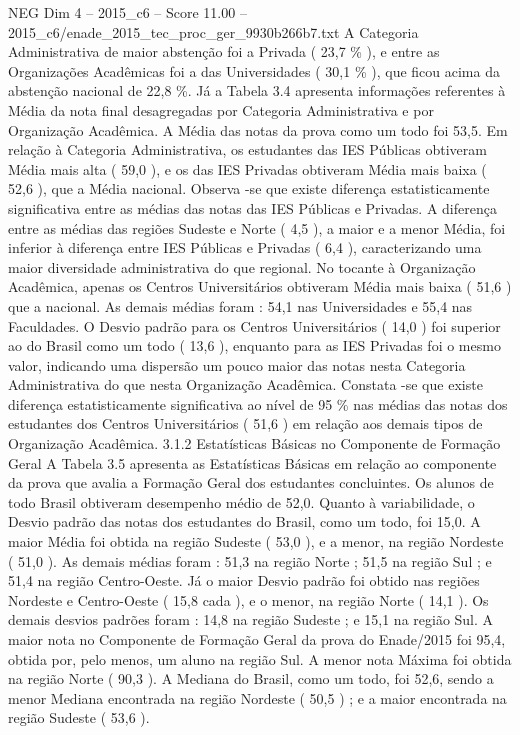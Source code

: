 \begin{textsample}{NEG Dim 4 – 2015\_c6 – Score 11.00 – 2015\_c6/enade\_2015\_tec\_proc\_ger\_9930b266b7.txt}
A Categoria Administrativa de maior abstenção foi a Privada ( 23,7 \% ), e entre as Organizações Acadêmicas foi a das Universidades ( 30,1 \% ), que ficou acima da abstenção nacional de 22,8 \%.
Já a Tabela 3.4 apresenta informações referentes à Média da nota final desagregadas por Categoria Administrativa e por Organização Acadêmica.
A Média das notas da prova como um todo foi 53,5.
Em relação à Categoria Administrativa, os estudantes das IES Públicas obtiveram Média mais alta ( 59,0 ), e os das IES Privadas obtiveram Média mais baixa ( 52,6 ), que a Média nacional.
Observa -se que existe diferença estatisticamente significativa entre as médias das notas das IES Públicas e Privadas.
A diferença entre as médias das regiões Sudeste e Norte ( 4,5 ), a maior e a menor Média, foi inferior à diferença entre IES Públicas e Privadas ( 6,4 ), caracterizando uma maior diversidade administrativa do que regional.
No tocante à Organização Acadêmica, apenas os Centros Universitários obtiveram Média mais baixa ( 51,6 ) que a nacional.
As demais médias foram : 54,1 nas Universidades e 55,4 nas Faculdades.
O Desvio padrão para os Centros Universitários ( 14,0 ) foi superior ao do Brasil como um todo ( 13,6 ), enquanto para as IES Privadas foi o mesmo valor, indicando uma dispersão um pouco maior das notas nesta Categoria Administrativa do que nesta Organização Acadêmica.
Constata -se que existe diferença estatisticamente significativa ao nível de 95 \% nas médias das notas dos estudantes dos Centros Universitários ( 51,6 ) em relação aos demais tipos de Organização Acadêmica. 3.1.2 Estatísticas Básicas no Componente de Formação Geral A Tabela 3.5 apresenta as Estatísticas Básicas em relação ao componente da prova que avalia a Formação Geral dos estudantes concluintes.
Os alunos de todo Brasil obtiveram desempenho médio de 52,0.
Quanto à variabilidade, o Desvio padrão das notas dos estudantes do Brasil, como um todo, foi 15,0.
A maior Média foi obtida na região Sudeste ( 53,0 ), e a menor, na região Nordeste ( 51,0 ).
As demais médias foram : 51,3 na região Norte ; 51,5 na região Sul ; e 51,4 na região Centro-Oeste.
Já o maior Desvio padrão foi obtido nas regiões Nordeste e Centro-Oeste ( 15,8 cada ), e o menor, na região Norte ( 14,1 ).
Os demais desvios padrões foram : 14,8 na região Sudeste ; e 15,1 na região Sul.
A maior nota no Componente de Formação Geral da prova do Enade/2015 foi 95,4, obtida por, pelo menos, um aluno na região Sul.
A menor nota Máxima foi obtida na região Norte ( 90,3 ).
A Mediana do Brasil, como um todo, foi 52,6, sendo a menor Mediana encontrada na região Nordeste ( 50,5 ) ; e a maior encontrada na região Sudeste ( 53,6 ).

\end{textsample}
